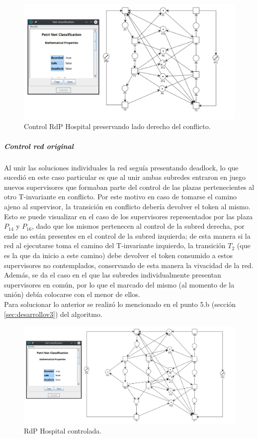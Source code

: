 \begin{figure}[H]
	\centering
		\includegraphics[scale=0.45]{Figures/algoritmo3/Hospital6.png}
	\caption{Control RdP Hospital preservando lado derecho del conflicto.}
	\label{fig:ladoderechoconflictocontrol}
 \end{figure}

\subparagraph{Control red original}
\hfill \break
Al unir las soluciones individuales la red seguía presentando deadlock, lo que sucedió en este caso particular es que al unir ambas subredes entraron en juego nuevos supervisores que formaban parte del control de las plazas pertenecientes al otro \break T-invariante en conflicto. Por este motivo en caso de tomarse el camino ajeno al supervisor, la transición en conflicto debería devolver el token al mismo. Esto se puede visualizar en el caso de los supervisores representados por las plaza $P_{14}$ y $P_{16}$, dado que los mismos pertenecen al control de la subred derecha, por ende no están presentes en el control de la subred izquierda; de esta manera si la red al ejecutarse toma el camino del T-invariante izquierdo, la transición $T_2$ (que es la que da inicio a este camino) debe devolver el token consumido a estos supervisores no contemplados, conservando de esta manera la vivacidad de la red.\\
Además, se da el caso en el que las subredes individualmente presentan supervisores en común, por lo que el marcado del mismo (al momento de la unión) debía colocarse con el menor de ellos.\\
Para solucionar lo anterior se realizó lo mencionado en el punto 5.b (sección \ref{sec:desarrollov3}) del algoritmo.

\begin{figure}[H]
	\centering
		\includegraphics[scale=0.4]{Figures/algoritmo3/Hospital7.png}
	\caption{RdP Hospital controlada.}
	\label{fig:hospitalcontrolada}
 \end{figure}

